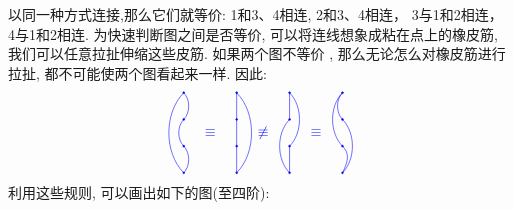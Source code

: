 以同一种方式连接,那么它们就等价: 1和3、4相连, 2和3、4相连， 3与1和2相连， 4与1和2相连. 为快速判断图之间是否等价, 可以将连线想象成粘在点上的橡皮筋, 我们可以任意拉扯伸缩这些皮筋. 如果两个图不等价 , 那么无论怎么对橡皮筋进行拉扯, 都不可能使两个图看起来一样. 因此:
\begin{equation*}
\begin{tikzpicture}[scale=.667,blue]
\filldraw (0,0) circle(1pt) (2,0)circle (1pt) (4,0) circle(1pt) (6,0) circle(1pt)
          (0,1) circle(1pt) (2,1)circle (1pt) (4,1) circle(1pt) (6,1) circle(1pt)
          (0,2) circle(1pt) (2,2)circle (1pt) (4,2) circle(1pt) (6,2) circle(1pt)
          (0,3) circle(1pt) (2,3)circle (1pt) (4,3) circle(1pt) (6,3) circle(1pt)
          ;
\draw	  (0,0) ..controls+(-.75,.75)   and +(-.75,-.75).. (0,3)
          (0,1) ..controls+(-.25,.25)   and +(-.25,-.25).. (0,2)
          (0,0) ..controls+(.25,.25)   and +(.25,-.25).. (0,1)
          (0,2) ..controls+(.25,.25) and +(.25,-.25).. (0,3)

          (2,0) -- (2,3) 
          (2,0) ..controls+(.75,.75)and+(.75,-.75)..(2,3)

          (4,0) -- (4,1)
          (4,1) ..controls+(.5,.5)and+(.5,-.5)..(4,3)
          (4,0) ..controls+(-.5,.5)and+(-.5,-.5)..(4,2) 
          (4,2) -- (4,3)
          
          (6,0)..controls+(.5,.5)and+(.5,-.5)..(6,2)
          (6,2)..controls+(-.25,.25)and+(-.25,-.25)..(6,3)
          (6,0)..controls+(.25,.5)and+(.25,-.25)..(6,1)
          (6,1)..controls+(-.5,.5)and+(-.5,-.5)..(6,3)
;
\draw     (1,1.5)node{$\equiv$} (3,1.5)node{$\not\equiv$} (5,1.5)node{$\equiv$};
\end{tikzpicture}
\end{equation*}
利用这些规则, 可以画出如下的图(至四阶):
